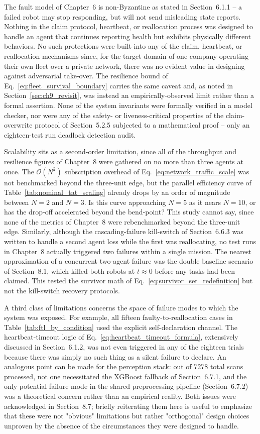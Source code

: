 The fault model of Chapter~6 is non-Byzantine as stated in Section~6.1.1 -- a failed robot may stop responding, but will not send misleading state reports. Nothing in the claim protocol, heartbeat, or reallocation process was designed to handle an agent that continues reporting health but exhibits physically different behaviors. No such protections were built into any of the claim, heartbeat, or reallocation mechanisms since, for the target domain of one company operating their own fleet over a private network, there was no evident value in designing against adversarial take-over. The resilience bound of Eq.~\eqref{eq:fleet_survival_boundary} carries the same caveat and, as noted in Section~\ref{sec:ch9_revisit}, was instead an empirically-observed limit rather than a formal assertion. None of the system invariants were formally verified in a model checker, nor were any of the safety- or liveness-critical properties of the claim-overwrite protocol of Section~5.2.5 subjected to a mathematical proof -- only an eighteen-test run deadlock detection audit.

Scalability sits as a second-order limitation, since all of the throughput and resilience figures of Chapter~8 were gathered on no more than three agents at once. The $\mathcal{O}(N^2)$ subscription overhead of Eq.~\eqref{eq:network_traffic_scale} was not benchmarked beyond the three-unit edge, but the parallel efficiency curve of Table~\ref{tab:nominal_tat_scaling} already drops by an order of magnitude between $N=2$ and $N=3$. Is this curve approaching $N=5$ as it nears $N=10$, or has the drop-off accelerated beyond the bend-point? This study cannot say, since none of the metrics of Chapter~8 were rebenchmarked beyond the three-unit edge. Similarly, although the cascading-failure kill-switch of Section~6.6.3 was written to handle a second agent loss while the first was reallocating, no test runs in Chapter~8 actually triggered two failures within a single mission. The nearest approximation of a concurrent two-agent failure was the double baseline scenario of Section~8.1, which killed both robots at $t \approx 0$ before any tasks had been claimed. This tested the survivor math of Eq.~\eqref{eq:survivor_set_redefinition} but not the kill-switch recovery protocols.

A third class of limitations concerns the space of failure modes to which the system was exposed. For example, all fifteen faulty-to-reallocation cases in Table~\ref{tab:ftl_by_condition} used the explicit self-declaration channel. The heartbeat-timeout logic of Eq.~\eqref{eq:heartbeat_timeout_formula}, extensively discussed in Section~6.1.2, was not even triggered in any of the eighteen trials because there was simply no such thing as a silent failure to declare. An analogous point can be made for the perception stack: out of 7278 total scans processed, not one necessitated the XGBoost fallback of Section~6.7.1, and the only potential failure mode in the shared preprocessing pipeline (Section~6.7.2) was a theoretical concern rather than an empirical reality. Both issues were acknowledged in Section~8.7; briefly reiterating them here is useful to emphasize that these were not "obvious" limitations but rather "orthogonal" design choices unproven by the absence of the circumstances they were designed to handle.

